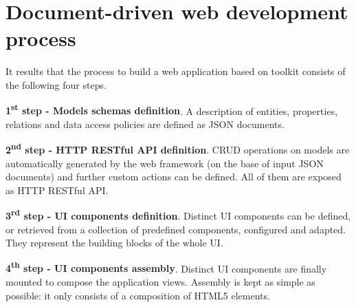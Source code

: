 \section{Document-driven web development process}\label{sec:dev-proc}

It results that the process to build a web application based on  toolkit consists of the following four steps.

{\bf 1\textsuperscript{st} step - Models schemas definition}. A description of entities, properties, relations and data access policies are defined as JSON documents.

{\bf 2\textsuperscript{nd} step - HTTP RESTful API definition}. CRUD operations on models are automatically generated by the web framework (on the base of input JSON documents) and further custom actions can be defined. All of them are exposed as HTTP RESTful API.

{\bf 3\textsuperscript{rd} step - UI components definition}. Distinct UI components can be defined, or retrieved from a collection of predefined components, configured and adapted. They represent the building blocks of the whole UI.

{\bf 4\textsuperscript{th} step - UI components assembly}. Distinct UI components are finally mounted to compose the application views. Assembly is kept as simple as possible: it only consists of a composition of HTML5 elements.



